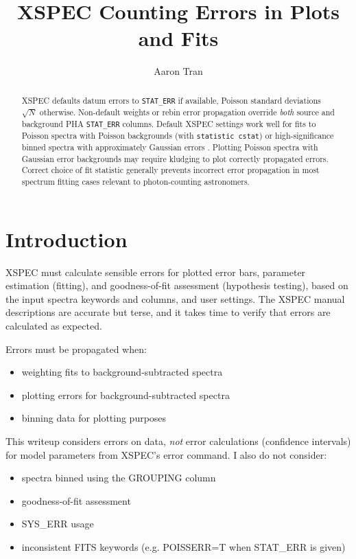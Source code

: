 \documentclass[onecolumn,tighten]{aastex6}
\newcommand*{\code}{\texttt}
\begin{document}
\title{XSPEC Counting Errors in Plots and Fits}

\author{Aaron Tran}

\begin{abstract}
XSPEC defaults datum errors to \code{STAT\_ERR} if available, Poisson standard
deviations $\sqrt{N}$ otherwise.
Non-default weights or rebin error propagation override \emph{both} source
and background PHA \code{STAT\_ERR} columns.
Default XSPEC settings work well for fits to Poisson spectra with Poisson
backgrounds (with \code{statistic cstat}) or high-significance binned spectra
with approximately Gaussian errors \citep[but cf.][]{humphrey2009}.
Plotting Poisson spectra with Gaussian error backgrounds may require kludging
to plot correctly propagated errors.
Correct choice of fit statistic generally prevents incorrect error propagation
in most spectrum fitting cases relevant to photon-counting astronomers.
\end{abstract}

\section{Introduction}

XSPEC must calculate sensible errors for plotted error bars, parameter
estimation (fitting), and goodness-of-fit assessment (hypothesis testing),
based on the input spectra keywords and columns, and user settings.
The XSPEC manual descriptions are accurate but terse, and it takes time to
verify that errors are calculated as expected.

Errors must be propagated when:
\begin{itemize}
    \item weighting fits to background-subtracted spectra
    \item plotting errors for background-subtracted spectra
    \item binning data for plotting purposes
\end{itemize}

This writeup considers errors on data, \emph{not} error calculations (confidence
intervals) for model parameters from XSPEC's error command.
I also do not consider:
\begin{itemize}
  \item spectra binned using the GROUPING column
  \item goodness-of-fit assessment
  \item SYS\_ERR usage
  \item inconsistent FITS keywords (e.g. POISSERR=T when STAT\_ERR is given)
\end{itemize}
\end{document}
